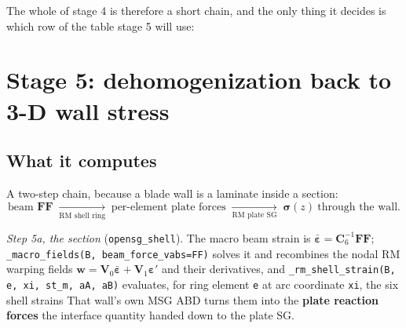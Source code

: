 The whole of stage 4 is therefore a short chain, and the only thing it decides
is which row of the table stage 5 will use:


\section{Stage 5: dehomogenization back to 3-D wall stress}
\label{sec:windio:stage5}

\subsection*{What it computes}

A two-step chain, because a blade wall is a laminate inside a section:
\[
  \text{beam } \mathbf{FF}
  \;\xrightarrow[\text{RM shell ring}]{}\;
  \text{per-element plate forces}
  \;\xrightarrow[\text{RM plate SG}]{}\;
  \boldsymbol{\sigma}(z)\ \text{through the wall.}
\]

\emph{Step 5a, the section} (\texttt{opensg\_shell}). The macro beam strain is
$\bar{\boldsymbol{\varepsilon}} = \mathbf{C}_6^{-1}\mathbf{FF}$;
\texttt{\_macro\_fields(B, beam\_force\_vabs=FF)} solves it and recombines the
nodal RM warping fields $\mathbf{w} = \mathbf{V}_0\bar{\boldsymbol{\varepsilon}}
+ \mathbf{V}_1\boldsymbol{\varepsilon}'$ and their derivatives, and
\texttt{\_rm\_shell\_strain(B, e, xi, st\_m, aA, aB)} evaluates, for ring
element \texttt{e} at arc coordinate \texttt{xi}, the six shell strains
That wall's own MSG ABD turns them into the \textbf{plate reaction forces}
the interface quantity handed down to the plate SG.

